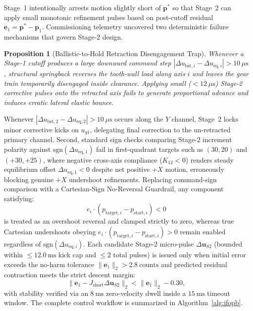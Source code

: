 \documentclass[journal]{IEEEtran}
\newtheorem{proposition}{Proposition}
\begin{document}
Stage~1 intentionally arrests motion slightly short of $\mathbf{p}^*$ so that Stage~2 can apply small monotonic refinement pulses based on post-cutoff residual $\mathbf{e}_1 = \mathbf{p}^* - \mathbf{p}_1$. Commissioning telemetry uncovered two deterministic failure mechanisms that govern Stage-2 design.

\begin{proposition}[Ballistic-to-Hold Retraction Disengagement Trap]
Whenever a Stage-1 cutoff produces a large downward command step $|\Delta u_{\text{bst},i} - \Delta u_{\text{eq},i}| > 10\ \mu\text{s}$, structural springback reverses the tooth-wall load along axis $i$ and leaves the gear train temporarily disengaged inside clearance. Applying small ($< 12\ \mu\text{s}$) Stage-2 corrective pulses onto the retracted axis fails to generate proportional advance and induces erratic lateral elastic bounce.
\end{proposition}

Whenever $|\Delta u_{\text{bst},2} - \Delta u_{\text{eq},2}| > 10\ \mu\text{s}$ occurs along the $Y$ channel, Stage~2 locks minor corrective kicks on $u_{y1}$, delegating final correction to the un-retracted primary channel. Second, standard sign checks comparing Stage-2 increment polarity against $\text{sgn}(\Delta u_{\text{eq},1})$ fail in first-quadrant targets such as $(30, 20)$ and $(+30, +25)$, where negative cross-axis compliance ($K_{12} < 0$) renders steady equilibrium offset $\Delta u_{\text{eq},1} < 0$ despite net positive $+X$ motion, erroneously blocking genuine $+X$ undershoot refinements. Replacing command-sign comparison with a Cartesian-Sign No-Reversal Guardrail, any component satisfying:
\begin{equation}
e_i \cdot (p_{\text{target},i} - p_{\text{start},i}) < 0
\end{equation}
is treated as an overshoot reversal and clamped strictly to zero, whereas true Cartesian undershoots obeying $e_i \cdot (p_{\text{target},i} - p_{\text{start},i}) > 0$ remain enabled regardless of $\text{sgn}(\Delta u_{\text{eq},i})$. Each candidate Stage-2 micro-pulse $\Delta\mathbf{u}_{S2}$ (bounded within $\le 12.0\ \text{ms}$ kick cap and $\le 2$ total pulses) is issued only when initial error exceeds the no-harm tolerance $\|\mathbf{e}_1\|_2 > 2.8\ \text{counts}$ and predicted residual contraction meets the strict descent margin:
\begin{equation}
\|\mathbf{e}_1 - J_{\text{short}}\Delta\mathbf{u}_{S2}\|_2 < \|\mathbf{e}_1\|_2 - 0.30,
\end{equation}
with stability verified via an $8\ \text{ms}$ zero-velocity dwell inside a $15\ \text{ms}$ timeout window. The complete control workflow is summarized in Algorithm~\ref{alg:ifopb}.
\end{document}
